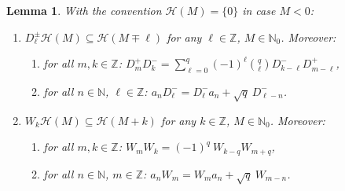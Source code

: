 \documentclass[letterpaper, DIV=17]{scrartcl}
\newtheorem{lemma}[theorem]{Lemma}
\numberwithin{equation}{section}
\theoremstyle{definition}
\begin{document}
%
			\begin{lemma} \label{prop:DW} With  the convention $\mathcal{H}(M) = \{ 0 \} $ in case $  M < 0 $:
			\begin{enumerate}
			\item 
			$ D_\ell^\pm \mathcal{H}(M)\subseteq \mathcal{H}(M\mp \ell)$ for any $ \ell  \in \mathbb{Z} $,  $ M \in \mathbb{N}_0 $. Moreover:
			\begin{enumerate}
			\item \label{CR D} 	for all $ m,k \in \mathbb{Z} $:	\quad $ \displaystyle
				D_m^+ D_k^-  = \sum_{\ell=0}^q (-1)^\ell \binom{q}{\ell} D_{k-\ell}^- D_{m-\ell}^+ $,
			\item \label{CR1b} for all $ n \in \mathbb{N} $, $ \ell \in \mathbb{Z} $: \quad $ \displaystyle a_n D_\ell^-  = D_\ell^- a_n + \sqrt{q}\  D_{\ell-n}^- $. 
			\end{enumerate}
			 \item $W_k \mathcal{H}(M)\subseteq \mathcal{H}(M+k)$ for any $ k \in \mathbb{Z} $, $ M \in \mathbb{N}_0 $. Moreover: 
			\begin{enumerate}
			\item \label{CR W} 	for all $ m,k \in \mathbb{Z} $: \quad $ \displaystyle
			 W_m W_k   = (-1)^q \ W_{k-q} W_{m+q} $,
			 \item for all $ n \in \mathbb{N} $, $ m \in \mathbb{Z} $:
			\quad $ \displaystyle  a_n W_m  = W_m a_n + \sqrt{q} \ W_{m-n} $. 
			 	 \end{enumerate}
			 \end{enumerate}
			\end{lemma}
\end{document}
